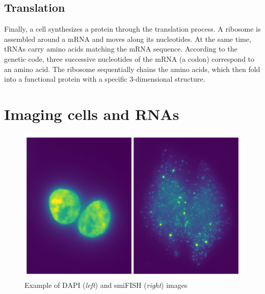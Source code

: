 
\subsection{Translation}
\label{subsec:intro_translation}

Finally, a cell synthesizes a protein through the translation process.
A ribosome is assembled around a \ac{mRNA} and moves along its nucleotides.
At the same time, \ac{tRNA}s carry amino acids matching the \ac{mRNA} sequence.
According to the genetic code, three successive nucleotides of the \ac{mRNA} (a codon) correspond to an amino acid.
The ribosome sequentially chains the amino acids, which then fold into a functional protein with a specific 3-dimensional structure.


\section{Imaging cells and RNAs}
\label{sec:fish}

\begin{figure}[]
    \centering
    \includegraphics[width=\textwidth]{figures/introduction/multichannel_input}
    \caption[Example of DAPI and smiFISH images]{Example of DAPI (\textit{left}) and smiFISH (\textit{right}) images}
    \label{fig:multichannel_input}
\end{figure}

